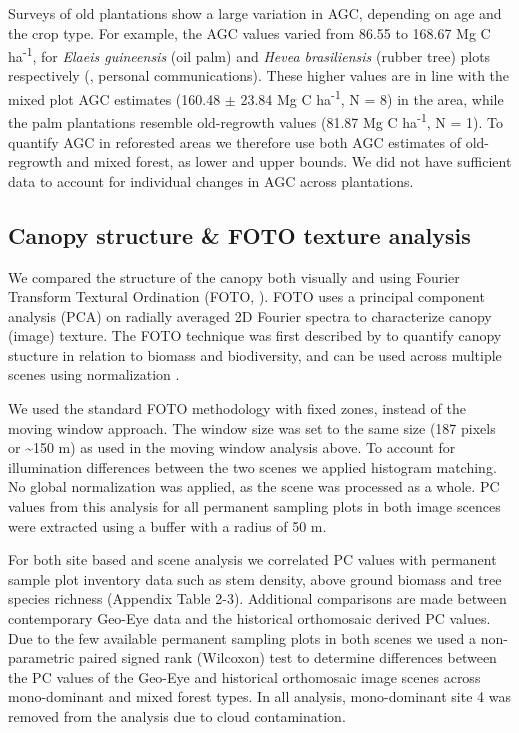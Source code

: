 \documentclass[remote sensing,article,submit,moreauthors,pdftex]{mdpi}
\begin{document}
Surveys of old plantations show a large variation in AGC, depending on
age and the crop type. For example, the AGC values varied from 86.55 to
168.67 Mg C ha\textsuperscript{-1}, for \emph{Elaeis guineensis} (oil
palm) and \emph{Hevea brasiliensis} (rubber tree) plots respectively
(\citet{bustillo2018}, personal communications). These higher values are
in line with the mixed plot AGC estimates (160.48 \(\pm\) 23.84 Mg C
ha\textsuperscript{-1}, N = 8) in the area, while the palm plantations
resemble old-regrowth values (81.87 Mg C ha\textsuperscript{-1}, N = 1).
To quantify AGC in reforested areas we therefore use both AGC estimates
of old-regrowth and mixed forest, as lower and upper bounds. We did not
have sufficient data to account for individual changes in AGC across
plantations.

\hypertarget{canopy-structure-foto-texture-analysis}{%
\subsection{Canopy structure \& FOTO texture
analysis}\label{canopy-structure-foto-texture-analysis}}

We compared the structure of the canopy both visually and using Fourier
Transform Textural Ordination (FOTO, \citet{couteron2002}). FOTO uses a
principal component analysis (PCA) on radially averaged 2D Fourier
spectra to characterize canopy (image) texture. The FOTO technique was
first described by \citet{couteron2002} to quantify canopy stucture in
relation to biomass and biodiversity, and can be used across multiple
scenes using normalization \citep{Barbier2010}.

We used the standard FOTO methodology with fixed zones, instead of the
moving window approach. The window size was set to the same size (187
pixels or \textasciitilde{}150 m) as used in the moving window analysis
above. To account for illumination differences between the two scenes we
applied histogram matching. No global normalization was applied, as the
scene was processed as a whole. PC values from this analysis for all
permanent sampling plots in both image scences were extracted using a
buffer with a radius of 50 m.

For both site based and scene analysis we correlated PC values with
permanent sample plot inventory data such as stem density, above ground
biomass and tree species richness (Appendix Table 2-3). Additional
comparisons are made between contemporary Geo-Eye data and the
historical orthomosaic derived PC values. Due to the few available
permanent sampling plots in both scenes we used a non-parametric paired
signed rank (Wilcoxon) test \citep{wilcoxon1945} to determine
differences between the PC values of the Geo-Eye and historical
orthomosaic image scenes across mono-dominant and mixed forest types. In
all analysis, mono-dominant site 4 was removed from the analysis due to
cloud contamination.
\end{document}
